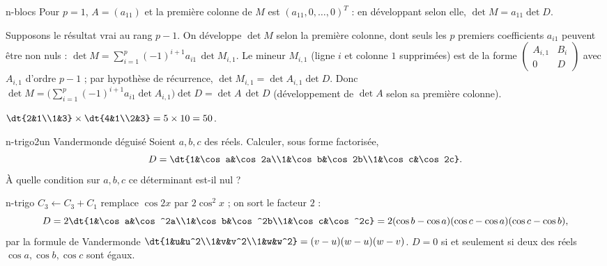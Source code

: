 \begin{corrige}{n-blocs}
 Pour $p=1$, $A=(a_{11})$ et la première colonne de $M$ est $(a_{11},0,\dots,0)^T$ : en développant selon elle, $\det M=a_{11}\det D$.

Supposons le résultat vrai au rang $p-1$. On développe $\det M$ selon la première colonne, dont seuls les $p$ premiers coefficients $a_{i1}$ peuvent être non nuls :
$\det M=\sum_{i=1}^p(-1)^{i+1}a_{i1}\,\det M_{i,1}$. Le mineur $M_{i,1}$ (ligne $i$ et colonne $1$ supprimées) est de la forme $\begin{pmatrix}A_{i,1}&B_i\\0&D\end{pmatrix}$ avec $A_{i,1}$ d'ordre $p-1$ ; par hypothèse de récurrence, $\det M_{i,1}=\det A_{i,1}\det D$. Donc
$\det M=\Big(\sum_{i=1}^p(-1)^{i+1}a_{i1}\det A_{i,1}\Big)\det D=\det A\,\det D$ (développement de $\det A$ selon sa première colonne).

 $\dt{2&1\\1&3}\times\dt{4&1\\2&3}=5\times10=50$.
\end{corrige}

\begin{exo}{n-trigo}{2}{un Vandermonde déguisé}
Soient $a,b,c$ des réels. Calculer, sous forme factorisée,
\[D=\dt{1&\cos a&\cos2a\\1&\cos b&\cos2b\\1&\cos c&\cos2c}.\]
À quelle condition sur $a,b,c$ ce déterminant est-il nul ?
\end{exo}

\begin{corrige}{n-trigo}
$C_3\leftarrow C_3+C_1$ remplace $\cos2x$ par $2\cos^2x$ ; on sort le facteur $2$ :
\[D=2\dt{1&\cos a&\cos^2a\\1&\cos b&\cos^2b\\1&\cos c&\cos^2c}=2(\cos b-\cos a)(\cos c-\cos a)(\cos c-\cos b),\]
par la formule de Vandermonde $\dt{1&u&u^2\\1&v&v^2\\1&w&w^2}=(v-u)(w-u)(w-v)$.
$D=0$ si et seulement si deux des réels $\cos a,\cos b,\cos c$ sont égaux.
\end{corrige}

